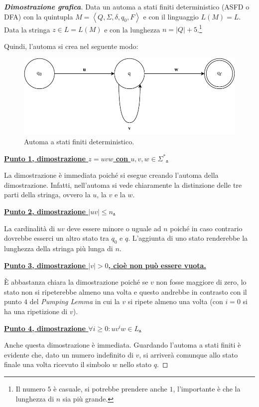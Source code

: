 \documentclass[a4paper]{article}
\begin{document}
	\begin{proof}[\textcolor{Green4}{\textbf{Dimostrazione grafica}}]
		Data un automa a stati finiti deterministico (ASFD o DFA) con la quintupla $M = \left\langle Q, \Sigma, \delta, q_{0}, F \right\rangle$ e con il linguaggio $L\left(M\right) = L$.\newline
		Data la stringa $z \in L = L\left(M\right)$ e con la lunghezza $n = |Q| + 5$.\footnote{Il numero $5$ è casuale, si potrebbe prendere anche $1$, l'importante è che la lunghezza di $n$ sia più grande.}\newline
		
		\noindent
		Quindi, l'automa si crea nel seguente modo:
		
		\begin{figure}[!htp]
			\centering
			\includegraphics[width=1\textwidth]{img/lemma_pumping1.pdf}
			\caption{Automa a stati finiti deterministico.}
		\end{figure}
	
		\noindent
		\textbf{\underline{Punto 1, dimostrazione $z = uvw$ con $u,v,w \in \Sigma^{*}$.}}
		
		\noindent
		La dimostrazione è immediata poiché si esegue creando l'automa della dimostrazione. Infatti, nell'automa si vede chiaramente la distinzione delle tre parti della stringa, ovvero la $u$, la $v$ e la $w$.\newline
		
		\noindent
		\textbf{\underline{Punto 2, dimostrazione $|uv| \le n$.}}
		
		\noindent
		La cardinalità di $uv$ deve essere minore o uguale ad $n$ poiché in caso contrario dovrebbe esserci un altro stato tra $q_{0}$ e $q$. L'aggiunta di uno stato renderebbe la lunghezza della stringa più lunga di $n$.
		
		\newpage
		
		\noindent
		\textbf{\underline{Punto 3, dimostrazione $|v| > 0$, cioè non può essere vuota.}}
		
		\noindent
		È abbastanza chiara la dimostrazione poiché se $v$ non fosse maggiore di zero, lo stato non si ripeterebbe almeno una volta e questo andrebbe in contrasto con il punto $4$ del \emph{Pumping Lemma} in cui la $v$ si ripete almeno una volta (con $i = 0$ si ha una ripetizione di $v$).\newline
		
		\noindent
		\textbf{\underline{Punto 4, dimostrazione $\forall i \ge 0: uv^{i}w \in L$.}}
		
		\noindent
		Anche questa dimostrazione è immediata. Guardando l'automa a stati finiti è evidente che, dato un numero indefinito di $v$, si arriverà comunque allo stato finale una volta ricevuto il simbolo $w$ nello stato $q$.
	\end{proof}
\end{document}
